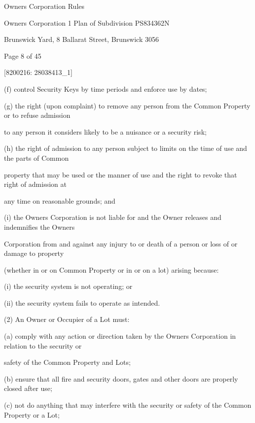 \documentclass{article}
\begin{document}
{\fontsize{9}{1}Owners Corporation Rules }

{\fontsize{9}{1}Owners Corporation 1 Plan of Subdivision PS834362N }

{\fontsize{9}{1}Brunswick Yard, 8 Ballarat Street, Brunswick 3056 }


{\fontsize{9}{1}Page 8  of 45 }



{\fontsize{7.02}{1}[8200216: 28038413\_1] }


{\fontsize{9.962}{1}(f) control Security Keys by time periods and enforce use by dates; }

{\fontsize{9.962}{1}(g) the right (upon complaint) to remove any person from the Common Property or to refuse admission }

{\fontsize{10.02}{1}to any person it considers likely to be a nuisance or a security risk; }

{\fontsize{9.962}{1}(h) the right of admission to any person subject to limits on the time of use and the parts of Common }

{\fontsize{10.02}{1}property that may be used or the manner of use and the right to revoke that right of admission at }

{\fontsize{10.02}{1}any time on reasonable grounds; and }

{\fontsize{9.962}{1}(i) the Owners Corporation is not liable for and the Owner releases and indemnifies the Owners }

{\fontsize{10.02}{1}Corporation from and against any injury to or death of a person or loss of or damage to property }

{\fontsize{10.02}{1}(whether in or on Common Property or in or on a lot) arising because: }

{\fontsize{9.962}{1}(i) the security system is not operating; or }

{\fontsize{9.962}{1}(ii) the security system fails to operate as intended. }

{\fontsize{9.962}{1}(2) An Owner or Occupier of a Lot must: }

{\fontsize{9.962}{1}(a) comply with any action or direction taken by the Owners Corporation in relation to the security or }

{\fontsize{10.02}{1}safety of the Common Property and Lots; }

{\fontsize{9.962}{1}(b) ensure that all fire and security doors, gates and other doors are properly closed after use; }

{\fontsize{9.962}{1}(c) not do anything that may interfere with the security or safety of the Common Property or a Lot; }
\end{document}
